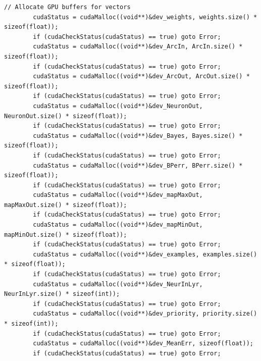 \documentclass[10pt,a4paper]{article}
\begin{document}
\begin{lstlisting}[style=mycuda, caption= classe di interfaccia alla GPU, captionpos=b]
		// Allocate GPU buffers for vectors    
		cudaStatus = cudaMalloc((void**)&dev_weights, weights.size() * sizeof(float));
		if (cudaCheckStatus(cudaStatus) == true) goto Error;
		cudaStatus = cudaMalloc((void**)&dev_ArcIn, ArcIn.size() * sizeof(float));
		if (cudaCheckStatus(cudaStatus) == true) goto Error;
		cudaStatus = cudaMalloc((void**)&dev_ArcOut, ArcOut.size() * sizeof(float));
		if (cudaCheckStatus(cudaStatus) == true) goto Error;
		cudaStatus = cudaMalloc((void**)&dev_NeuronOut, NeuronOut.size() * sizeof(float));
		if (cudaCheckStatus(cudaStatus) == true) goto Error;
		cudaStatus = cudaMalloc((void**)&dev_Bayes, Bayes.size() * sizeof(float));
		if (cudaCheckStatus(cudaStatus) == true) goto Error;
		cudaStatus = cudaMalloc((void**)&dev_BPerr, BPerr.size() * sizeof(float));
		if (cudaCheckStatus(cudaStatus) == true) goto Error;
		cudaStatus = cudaMalloc((void**)&dev_mapMaxOut, mapMaxOut.size() * sizeof(float));
		if (cudaCheckStatus(cudaStatus) == true) goto Error;
		cudaStatus = cudaMalloc((void**)&dev_mapMinOut, mapMinOut.size() * sizeof(float));
		if (cudaCheckStatus(cudaStatus) == true) goto Error;
		cudaStatus = cudaMalloc((void**)&dev_examples, examples.size() * sizeof(float));
		if (cudaCheckStatus(cudaStatus) == true) goto Error;
		cudaStatus = cudaMalloc((void**)&dev_NeurInLyr, NeurInLyr.size() * sizeof(int));
		if (cudaCheckStatus(cudaStatus) == true) goto Error;
		cudaStatus = cudaMalloc((void**)&dev_priority, priority.size() * sizeof(int));
		if (cudaCheckStatus(cudaStatus) == true) goto Error;
		cudaStatus = cudaMalloc((void**)&dev_MeanErr, sizeof(float));
		if (cudaCheckStatus(cudaStatus) == true) goto Error;



\end{lstlisting}
\end{document}
